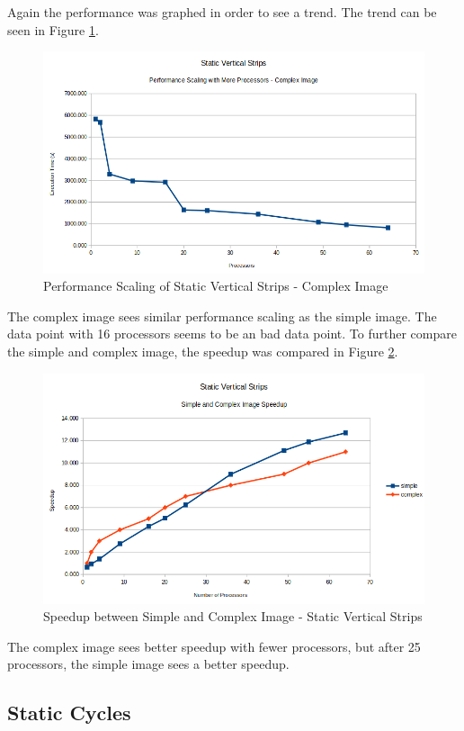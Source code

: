 \documentclass[11pt]{article}
\begin{document}
		Again the performance was graphed in order to see a trend. The trend can be seen in Figure \ref{fig:static-stips-complex}.
		
		\begin{figure}[H]
			\centering
			\includegraphics[width=0.7\linewidth]{Pictures/Static-stips-complex}
			\caption{Performance Scaling of Static Vertical Strips - Complex Image}
			\label{fig:static-stips-complex}
		\end{figure}
		
		The complex image sees similar performance scaling as the simple image. The data point with 16 processors seems to be an bad data point. To further compare the simple and complex image, the speedup was compared in Figure \ref{fig:static-strips-comparison}.
		
		\begin{figure}[H]
			\centering
			\includegraphics[width=0.7\linewidth]{"Pictures/Static strips comparison"}
			\caption{Speedup between Simple and Complex Image - Static Vertical Strips}
			\label{fig:static-strips-comparison}
		\end{figure}
		
		The complex image sees better speedup with fewer processors, but after 25 processors, the simple image sees a better speedup.
	
	\subsection{Static Cycles}
	
\end{document}
